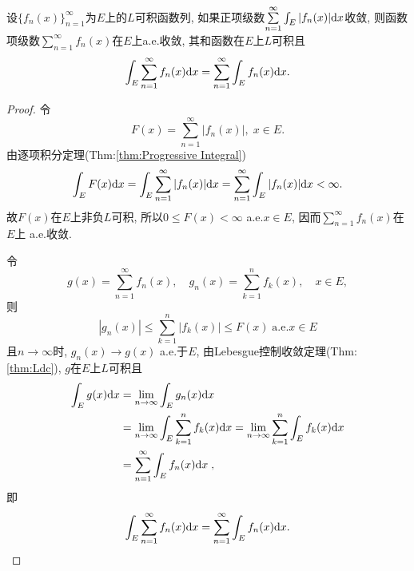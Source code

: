 \begin{theorem}[逐项积分定理]
	设$\{ f_n(x) \}_{n=1}^{\infty}$为$E$上的$L$可积函数列, 如果正项级数$\sum\limits_{n = 1}^{\infty} \int_E | f_n(x) | \mathrm{d} x$收敛, 则函数项级数$\sum\limits_{n = 1}^{\infty} f_n(x)$在$E$上a.e.收敛, 其和函数在$E$上$L$可积且
	\begin{equation}
		\int_E \sum\limits_{n = 1}^{\infty} f_n(x) \mathrm{d} x =
		\sum\limits_{n = 1}^{\infty} \int_E f_n(x) \mathrm{d} x.
	\end{equation}
\end{theorem}
\begin{proof}
	令
	$$
		F(x) = \sum\limits_{n = 1}^{\infty} |f_n(x)|, \; x \in E.
	$$
	由逐项积分定理(Thm:\ref{thm:Progressive Integral})
	$$
		\int_E F(x) \mathrm{d} x
		= \int_E \sum\limits_{n = 1}^{\infty} |f_n(x)| \mathrm{d} x
		= \sum\limits_{n = 1}^{\infty} \int_E |f_n(x)| \mathrm{d} x
		< \infty.
	$$
	故$F(x)$在$E$上非负$L$可积, 所以$0 \leq F(x) < \infty$ a.e.$x \in E$, 
	因而$\sum\limits_{n = 1}^{\infty} f_n(x)$在$E$上 a.e.收敛. 
	
	令
	$$
		g(x) = \sum\limits_{n = 1}^{\infty} f_n(x) ,\quad
		g_n(x) = \sum\limits_{k = 1}^{n} f_k(x) ,\quad
		x \in E ,
	$$
	则
	$$
		| g_n(x) | \leq \sum\limits_{k = 1}^{n} | f_k(x) | \leq F(x) 
		\;\text{a.e.} x \in E
	$$
	且$n \to \infty$时, $g_n(x) \to g(x)$ a.e.于$E$, 
	由Lebesgue控制收敛定理(Thm:\ref{thm:Ldc}), $g$在$E$上$L$可积且
	$$
		\begin{aligned}
			\int_E g(x) \mathrm{d} x
			&= \lim\limits_{n \to \infty} \int_E g_n(x) \mathrm{d} x \\
			&= \lim\limits_{n \to \infty} \int_E \sum\limits_{k = 1}^{n} f_k(x) \mathrm{d} x 
			= \lim\limits_{n \to \infty}  \sum\limits_{k = 1}^{n} \int_E f_k(x) \mathrm{d} x \\
			&= \sum\limits_{n = 1}^{\infty} \int_E f_n(x) \mathrm{d} x \; ,
		\end{aligned}
	$$
	即
	$$
		\int_E \sum\limits_{n = 1}^{\infty} f_n(x) \mathrm{d} x =
		\sum\limits_{n = 1}^{\infty} \int_E f_n(x) \mathrm{d} x.
	$$
\end{proof}

